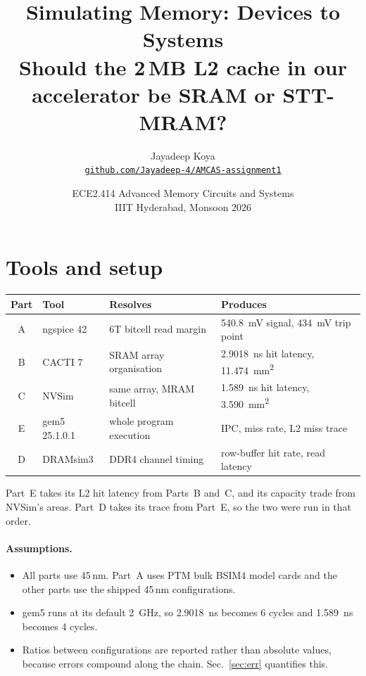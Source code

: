 \documentclass[9pt,a4paper]{extarticle}
\title{\vspace{-1.2cm}\textbf{Simulating Memory: Devices to Systems}\\[2pt]
\large Should the 2\,MB L2 cache in our accelerator be SRAM or STT-MRAM?}
\author{Jayadeep Koya \\
\small\texttt{\href{https://github.com/Jayadeep-4/AMCAS-assignment1}%
{github.com/Jayadeep-4/AMCAS-assignment1}}}
\date{\small ECE2.414 Advanced Memory Circuits and Systems \\
IIIT Hyderabad, Monsoon 2026}
\begin{document}
\maketitle
\vspace{-0.6cm}

\section{Tools and setup}

\begin{center}\small
\renewcommand{\arraystretch}{1.25}
\begin{tabular}{|c|l|l|l|}
\hline
\textbf{Part} & \textbf{Tool} & \textbf{Resolves} & \textbf{Produces} \\
\hline
A & ngspice 42 & 6T bitcell read margin & \SI{540.8}{mV} signal, \SI{434}{mV} trip point \\
\hline
B & CACTI 7 & SRAM array organisation & \SI{2.9018}{ns} hit latency, \SI{11.474}{mm^2} \\
\hline
C & NVSim & same array, MRAM bitcell & \SI{1.589}{ns} hit latency, \SI{3.590}{mm^2} \\
\hline
E & gem5 25.1.0.1 & whole program execution & IPC, miss rate, L2 miss trace \\
\hline
D & DRAMsim3 & DDR4 channel timing & row-buffer hit rate, read latency \\
\hline
\end{tabular}
\end{center}

Part~E takes its L2 hit latency from Parts~B and~C, and its capacity trade
from NVSim's areas. Part~D takes its trace from Part~E, so the two were
run in that order.

\paragraph{Assumptions.}
\begin{itemize}
\item All parts use 45\,nm. Part~A uses PTM bulk BSIM4 model cards and the
other parts use the shipped 45\,nm configurations.
\item gem5 runs at its default \SI{2}{GHz}, so \SI{2.9018}{ns} becomes 6
cycles and \SI{1.589}{ns} becomes 4 cycles.
\item Ratios between configurations are reported rather than absolute
values, because errors compound along the chain. Sec.~\ref{sec:err}
quantifies this.
\end{itemize}
\end{document}
